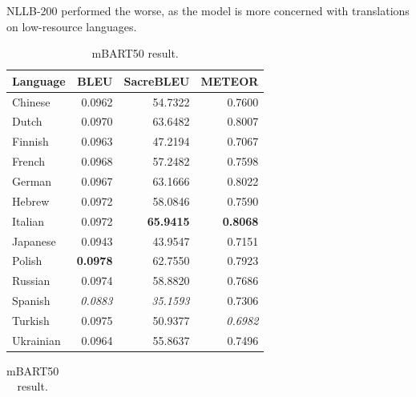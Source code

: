 \documentclass[a4paper]{article}
\begin{document}
NLLB-200 performed the worse, as the model is more concerned with translations on low-resource languages.


\begin{table}[htbp]
    \centering
    \begin{minipage}{0.49\linewidth}
        \footnotesize
        \begin{tabular}{|l|r|r|r|}
            \hline
            \textbf{Language} & \textbf{BLEU}   & \textbf{SacreBLEU} & \textbf{METEOR} \\
            \hline
            Chinese           & 0.0962          & 54.7322            & 0.7600          \\
            Dutch             & 0.0970          & 63.6482            & 0.8007          \\
            Finnish           & 0.0963          & 47.2194            & 0.7067          \\
            French            & 0.0968          & 57.2482            & 0.7598          \\
            German            & 0.0967          & 63.1666            & 0.8022          \\
            Hebrew            & 0.0972          & 58.0846            & 0.7590          \\
            Italian           & 0.0972          & \textbf{65.9415}   & \textbf{0.8068} \\
            Japanese          & 0.0943          & 43.9547            & 0.7151          \\
            Polish            & \textbf{0.0978} & 62.7550            & 0.7923          \\
            Russian           & 0.0974          & 58.8820            & 0.7686          \\
            Spanish           & \textit{0.0883} & \textit{35.1593}   & 0.7306          \\
            Turkish           & 0.0975          & 50.9377            & \textit{0.6982} \\
            Ukrainian         & 0.0964          & 55.8637            & 0.7496          \\
            \hline
        \end{tabular}
        \caption{mBART50 result.}
        \label{table:mbart_result}
    \end{minipage}
    \begin{minipage}{0.49\linewidth}
        \footnotesize
        \begin{tabular}{|l|r|r|r|}

\end{tabular}
\end{minipage}
\end{table}
\end{document}

